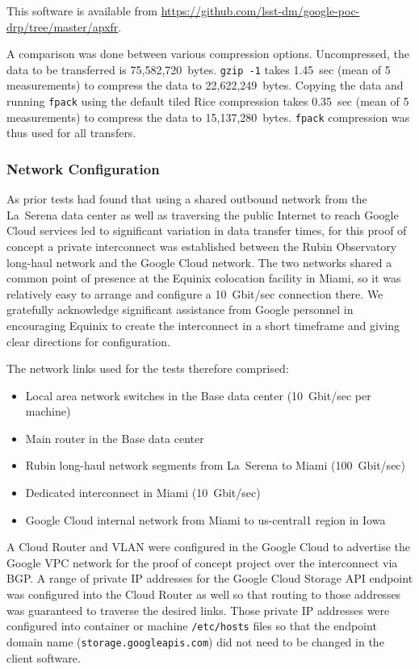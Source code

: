 This software is available from \url{https://github.com/lsst-dm/google-poc-drp/tree/master/apxfr}.

A comparison was done between various compression options.
Uncompressed, the data to be transferred is 75,582,720~bytes.
\texttt{gzip -1} takes 1.45~sec (mean of 5 measurements) to compress the data to 22,622,249~bytes.
Copying the data and running \texttt{fpack} using the default tiled Rice compression takes 0.35~sec (mean of 5 measurements) to compress the data to 15,137,280~bytes.
\texttt{fpack} compression was thus used for all transfers.

\subsubsection{Network Configuration}

As prior tests had found that using a shared outbound network from the La~Serena data center as well as traversing the public Internet to reach Google Cloud services led to significant variation in data transfer times, for this proof of concept a private interconnect was established between the Rubin Observatory long-haul network and the Google Cloud network.
The two networks shared a common point of presence at the Equinix colocation facility in Miami, so it was relatively easy to arrange and configure a 10~Gbit/sec connection there.
We gratefully acknowledge significant assistance from Google personnel in encouraging Equinix to create the interconnect in a short timeframe and giving clear directions for configuration.

The network links used for the tests therefore comprised:
\begin{itemize}
\item Local area network switches in the Base data center (10~Gbit/sec per machine)
\item Main router in the Base data center
\item Rubin long-haul network segments from La~Serena to Miami (100~Gbit/sec)
\item Dedicated interconnect in Miami (10~Gbit/sec)
\item Google Cloud internal network from Miami to us-central1 region in Iowa
\end{itemize}

A Cloud Router and VLAN were configured in the Google Cloud to advertise the Google VPC network for the proof of concept project over the interconnect via BGP.
A range of private IP addresses for the Google Cloud Storage API endpoint was configured into the Cloud Router as well so that routing to those addresses was guaranteed to traverse the desired links.
Those private IP addresses were configured into container or machine \texttt{/etc/hosts} files so that the endpoint domain name (\texttt{storage.googleapis.com}) did not need to be changed in the client software.

